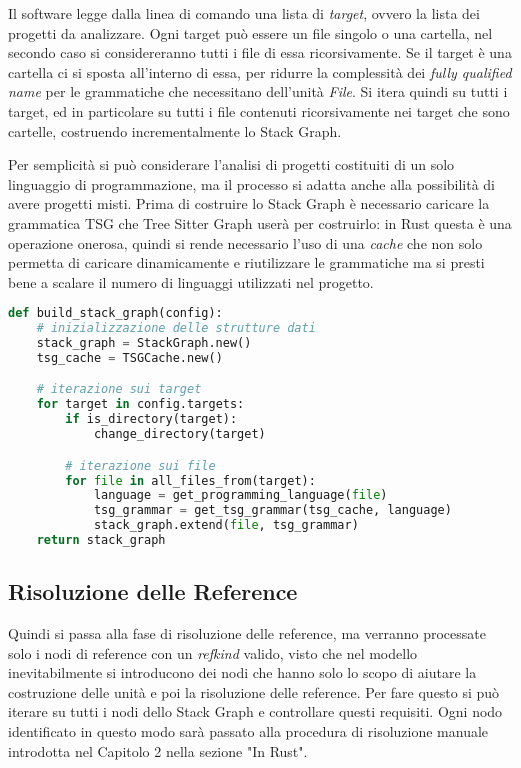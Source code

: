 Il software legge dalla linea di comando una lista di \emph{target}, ovvero la lista dei progetti da analizzare.
Ogni target pu\`o essere un file singolo o una cartella, nel secondo caso si considereranno tutti i file di essa ricorsivamente. Se il target \`e una cartella ci si sposta all'interno di essa, per ridurre la complessit\`a dei \emph{fully qualified name} per le grammatiche che necessitano dell'unit\`a \emph{File}.
Si itera quindi su tutti i target, ed in particolare su tutti i file contenuti ricorsivamente nei target che sono cartelle, costruendo incrementalmente lo Stack Graph.

Per semplicit\`a si pu\`o considerare l'analisi di progetti costituiti di un solo linguaggio di programmazione, ma il processo si adatta anche alla possibilit\`a di avere progetti misti. Prima di costruire lo Stack Graph \`e necessario caricare la grammatica TSG che Tree Sitter Graph user\`a per costruirlo: in Rust questa \`e una operazione onerosa, quindi si rende necessario l'uso di una \emph{cache} che non solo permetta di caricare dinamicamente e riutilizzare le grammatiche ma si presti bene a scalare il numero di linguaggi utilizzati nel progetto.

\begin{lstlisting}[language=Python, caption=pseudocodice]
def build_stack_graph(config):
    # inizializzazione delle strutture dati
    stack_graph = StackGraph.new()
    tsg_cache = TSGCache.new()

    # iterazione sui target
    for target in config.targets:
        if is_directory(target):
            change_directory(target)

        # iterazione sui file
        for file in all_files_from(target):
            language = get_programming_language(file)
            tsg_grammar = get_tsg_grammar(tsg_cache, language)
            stack_graph.extend(file, tsg_grammar)
    return stack_graph
\end{lstlisting}

\subsection{Risoluzione delle Reference}

Quindi si passa alla fase di risoluzione delle reference, ma verranno processate solo i nodi di reference con un \emph{refkind} valido, visto che nel modello inevitabilmente si introducono dei nodi che hanno solo lo scopo di aiutare la costruzione delle unit\`a e poi la risoluzione delle reference.
Per fare questo si pu\`o iterare su tutti i nodi dello Stack Graph e controllare questi requisiti.
Ogni nodo identificato in questo modo sar\`a passato alla procedura di risoluzione manuale introdotta nel Capitolo 2 nella sezione "In Rust".

